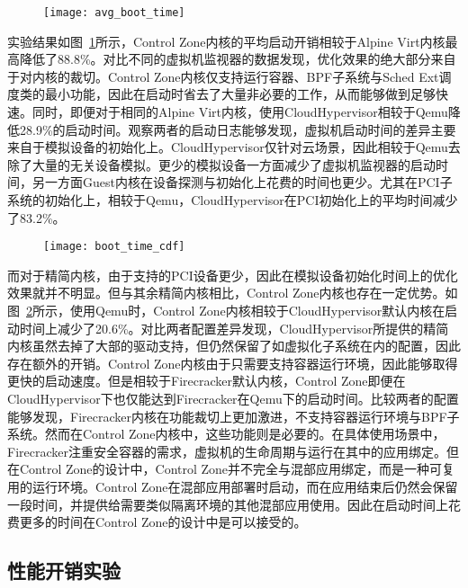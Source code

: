 \begin{figure}[H]
    \centering
    \texttt{[image: avg\_boot\_time]}
    \label{fig:avg_boot_time}
\end{figure}

实验结果如图~\ref{fig:avg_boot_time}所示，Control Zone内核的平均启动开销相较于Alpine Virt内核最高降低了88.8\%。对比不同的虚拟机监视器的数据发现，优化效果的绝大部分来自于对内核的裁切。Control Zone内核仅支持运行容器、BPF子系统与Sched Ext调度类的最小功能，因此在启动时省去了大量非必要的工作，从而能够做到足够快速。同时，即便对于相同的Alpine Virt内核，使用CloudHypervisor相较于Qemu降低28.9\%的启动时间。观察两者的启动日志能够发现，虚拟机启动时间的差异主要来自于模拟设备的初始化上。CloudHypervisor仅针对云场景，因此相较于Qemu去除了大量的无关设备模拟。更少的模拟设备一方面减少了虚拟机监视器的启动时间，另一方面Guest内核在设备探测与初始化上花费的时间也更少。尤其在PCI子系统的初始化上，相较于Qemu，CloudHypervisor在PCI初始化上的平均时间减少了83.2\%。

\begin{figure}[!htbp]
    \centering
    \texttt{[image: boot\_time\_cdf]}
    \label{fig:boot_time_cdf}
\end{figure}

而对于精简内核，由于支持的PCI设备更少，因此在模拟设备初始化时间上的优化效果就并不明显。但与其余精简内核相比，Control Zone内核也存在一定优势。如图~\ref{fig:boot_time_cdf}所示，使用Qemu时，Control Zone内核相较于CloudHypervisor默认内核在启动时间上减少了20.6\%。对比两者配置差异发现，CloudHypervisor所提供的精简内核虽然去掉了大部的驱动支持，但仍然保留了如虚拟化子系统在内的配置，因此存在额外的开销。Control Zone内核由于只需要支持容器运行环境，因此能够取得更快的启动速度。但是相较于Firecracker默认内核，Control Zone即便在CloudHypervisor下也仅能达到Firecracker在Qemu下的启动时间。比较两者的配置能够发现，Firecracker内核在功能裁切上更加激进，不支持容器运行环境与BPF子系统。然而在Control Zone内核中，这些功能则是必要的。在具体使用场景中，Firecracker注重安全容器的需求，虚拟机的生命周期与运行在其中的应用绑定。但在Control Zone的设计中，Control Zone并不完全与混部应用绑定，而是一种可复用的运行环境。Control Zone在混部应用部署时启动，而在应用结束后仍然会保留一段时间，并提供给需要类似隔离环境的其他混部应用使用。因此在启动时间上花费更多的时间在Control Zone的设计中是可以接受的。

\subsection{性能开销实验}

